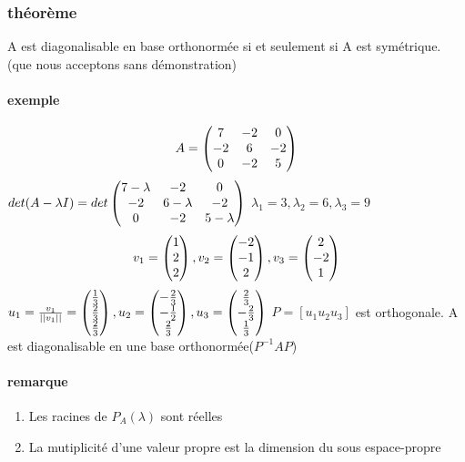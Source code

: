 \documentclass[a4paper,10pt]{article}
\begin{document}
\subsubsection{théorème}
A est diagonalisable en base orthonormée si et seulement si A est symétrique.
\newline
(que nous acceptons sans démonstration)
\paragraph{exemple}
\[
A=\begin{pmatrix}
   7&-2&0\cr
   -2&6&-2\cr
   0&-2&5\cr
  \end{pmatrix}
\]
\newline
$det(A-\lambda I)=det\begin{pmatrix}
                      7-\lambda&-2&0\cr
                      -2&6-\lambda&-2\cr
                      0&-2&5-\lambda\cr
                     \end{pmatrix}
$
\newline
$\lambda_1=3,\lambda_2=6,\lambda_3=9$
\newline
\[
v_1=\begin{pmatrix}
     1\cr
     2\cr
     2\cr
    \end{pmatrix}
,v_2=\begin{pmatrix}
      -2\cr
      -1\cr
      2\cr
     \end{pmatrix}
,v_3=\begin{pmatrix}
      2\cr
      -2\cr
      1\cr
     \end{pmatrix}
\]
\newline
$u_1=\frac{v_1}{||v_1||}=\begin{pmatrix}
                          \frac{1}{3}\cr
                          \frac{2}{3}\cr
                          \frac{2}{3}\cr
                         \end{pmatrix}
,u_2=\begin{pmatrix}
      -\frac{2}{3}\cr
      -\frac{1}{2}\cr
      \frac{2}{3}
     \end{pmatrix}
,u_3=\begin{pmatrix}
      \frac{2}{3}\cr
      -\frac{2}{3}\cr
      \frac{1}{3}\cr
     \end{pmatrix}
$
\newline
$P=[u_1u_2u_3]$ est orthogonale. A est diagonalisable en une base orthonormée($P^{-1}AP$)
\paragraph{remarque}
\begin{enumerate}
 \item Les racines de $P_A(\lambda)$ sont réelles
 \item La mutiplicité d'une valeur propre est la dimension du sous espace-propre
\end{enumerate}
\end{document}
